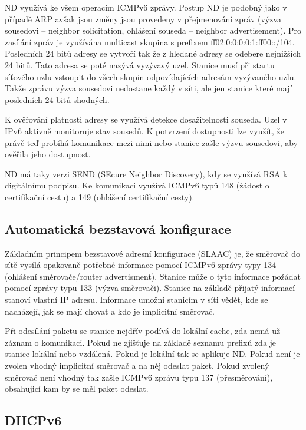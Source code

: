ND využívá ke všem operacím ICMPv6 zprávy.
Postup ND je podobný jako v případě ARP avšak jsou změny jsou provedeny v přejmenování zpráv (výzva sousedovi -- neighbor solicitation, ohlášení souseda -- neighbor advertisement).
Pro zasílání zpráv je využívána multicast skupina s prefixem ff02:0:0:0:0:1:ff00::/104.
Posledních 24 bitů adresy se vytvoří tak že z hledané adresy se odebere nejnižších 24 bitů.
Tato adresa se poté nazývá vyzývavý uzel.
Stanice musí při startu síťového uzlu vstoupit do všech skupin odpovídajících adresám vyzývaného uzlu.
Takže zprávu výzva sousedovi nedostane každý v síti, ale jen stanice které mají posledních 24 bitů shodných.

K ověřování platnosti adresy se využívá detekce dosažitelnosti souseda.
Uzel v IPv6 aktivně monitoruje stav sousedů.
K potvrzení dostupnosti lze využít, že právě teď probíhá komunikace mezi nimi nebo stanice zašle výzvu sousedovi, aby ověřila jeho dostupnost.

ND má taky verzi SEND (SEcure Neighbor Discovery), kdy se využívá RSA k digitálnímu podpisu.
Ke komunikaci využívá ICMPv6 typů 148 (žádost o certifikační cestu) a 149 (ohlášení certifikační cesty).

\subsection{Automatická bezstavová konfigurace}

Základním principem bezstavové adresní konfigurace (SLAAC) je, že směrovač do sítě vysílá opakovaně potřebné informace pomocí ICMPv6 zprávy typy 134 (ohlášení směrovače/router advertisment).
Stanice může o tyto informace požádat pomocí zprávy typu 133 (výzva směrovači).
Stanice na základě přijatý informací stanoví vlastní IP adresu.
Informace umožní stanicím v síti vědět, kde se nacházejí, jak se mají chovat a kdo je implicitní směrovač.


Při odesílání paketu se stanice nejdřív podívá do lokální cache, zda nemá už záznam o komunikaci.
Pokud ne zjišťuje na základě seznamu prefixů zda je stanice lokální nebo vzdálená.
Pokud je lokální tak se aplikuje ND.
Pokud není je zvolen vhodný implicitní směrovač a na něj odeslat paket.
Pokud zvolený směrovač není vhodný tak zašle ICMPv6 zprávu typu 137 (přesměrování), obsahujicí kam by se měl paket odeslat.

\subsection{DHCPv6}


